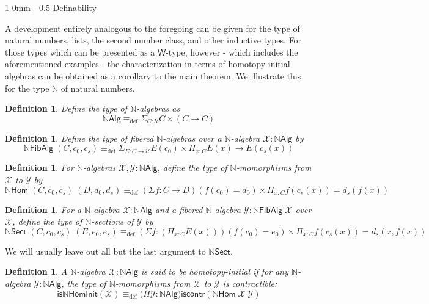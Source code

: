 \documentclass[reqno,10pt,a4paper,oneside]{amsart}
\makeatletter
\numberwithin{equation}{section}
\renewcommand{\section}{\@startsection
  {section}%
   {1}%
  {0mm}%
   {-\baselineskip}%
  {0.5\baselineskip}%
   {\Large\bfseries}}%
\theoremstyle{mythm}
\theoremstyle{mydef}
\newtheorem{definition}[theorem]{Definition}
\theoremstyle{myrmk}
\newcommand{\deq}{\equiv}
\newcommand{\defeq}{\deq_{\mathrm{def}}}
\newcommand{\iscontr}{\mathsf{iscontr}}
\newcommand{\U}{\mathcal{U}}
\newcommand{\prd}[1]{\Pi_{#1}}
\newcommand{\sm}[1]{\Sigma_{#1}}
\newcommand{\nat}{\ensuremath{\mathbb{N}}}
\newcommand{\W}{\mathsf{W}}
\newcommand{\NatAlg}{\nat\mathsf{Alg}}
\newcommand{\NatHom}{\nat\mathsf{Hom}}
\newcommand{\NatFibAlg}{\nat\mathsf{FibAlg}}
\newcommand{\NatFibHom}{\nat\mathsf{Sect}}
\newcommand{\IsNatHInit}{\mathsf{is}\nat\mathsf{HomInit}}
\newcommand{\X}{\mathcal{X}}
\newcommand{\Y}{\mathcal{Y}}
\makeatother
\begin{document}
\section{Definability}
\label{sec:definability}

A development entirely analogous to the foregoing can be given for the type of natural numbers, lists, the second number class, and other inductive types. For those types which can be presented as a $\W$-type, however - which includes the aforementioned examples - the characterization in terms of homotopy-initial algebras can be obtained as a corollary to the main theorem. We illustrate this for the type $\nat$ of natural numbers.

\begin{definition}\label{def:NatAlg}
Define the type of \emph{$\nat$-algebras} as 
\[\NatAlg \defeq \sm{C : \U} C \times (C \to C) \]
\end{definition}

\begin{definition}\label{def:NatFibAlg}
Define the type of \emph{fibered $\nat$-algebras} over a $\nat$-algebra $\X : \NatAlg$ by
\[\NatFibAlg \; (C,c_0,c_s) \defeq \sm{E : C \to \U} E(c_0) \times \prd{x:C} E(x) \to E(c_s(x)) \]
\end{definition}

\begin{definition}\label{def:NatHom}
For $\nat$-algebras $\X,\Y: \NatAlg$, define the type of \emph{$\nat$-momorphisms} from $\X$ to $\Y$ by 
\[\NatHom \; (C,c_0,c_s) \; (D,d_0,d_s) \defeq (\Sigma f:C \to D) (f(c_0) = d_0) \times \prd{x:C} f(c_s(x)) = d_s(f(x)) \]
\end{definition}

\begin{definition}\label{def:NatFibHom}
For a $\nat$-algebra $\X : \NatAlg$ and a fibered $\nat$-algebra $\Y : \NatFibAlg \; \X$ over $\X$, define the type of \emph{$\nat$-sections} of $\Y$ by
\[\NatFibHom \; (C,c_0,c_s) \; (E,e_0,e_s) \defeq (\Sigma f:(\prd{x:C} E(x))) (f(c_0) = e_0) \times \prd{x:C} f(c_s(x)) = d_s(x,f(x)) \]
\end{definition}
We will usually leave out all but the last argument to $\NatFibHom$.

\begin{definition}\label{def:NatHInit}
A $\nat$-algebra $\X : \NatAlg$ is said to be \emph{homotopy-initial} if for any $\nat$-algebra $\Y : \NatAlg$, the type of $\nat$-momorphisms from $\X$ to $\Y$ is contractible:
\[ \IsNatHInit(\X) \defeq \big(\Pi \Y:\NatAlg\big) \iscontr(\NatHom \; \X \; \Y) \]  
\end{definition}
\end{document}
